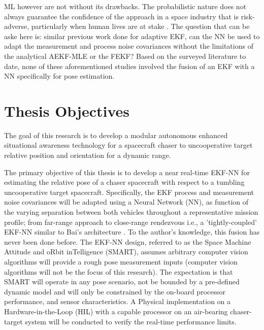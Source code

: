 ML however are not without its drawbacks. The probabilistic nature does not always guarantee the confidence of the approach in a space industry that is risk-adverse, particularly when human lives are at stake \cite{mcGovernMLSpaceLimits11, xuMLSpaceRelaibility2021107530}. The question that can be aske here is: similar previous work done for adaptive EKF, can the NN be used to adapt the measurement and process noise covariances without the limitations of the analytical AEKF-MLE or the FEKF? Based on the surveyed literature to date, none of these aforementioned studies involved the fusion of an EKF with a NN specifically for pose estimation. 
 
\section{Thesis Objectives}\label{CHAP1_4}

The goal of this research is to develop a modular autonomous enhanced situational awareness technology for a spacecraft chaser to uncooperative target relative position and orientation for a dynamic range.

The primary objective of this thesis is to develop a near real-time EKF-NN for estimating the relative pose of a chaser spacecraft with respect to a tumbling uncooperative target spacecraft. Specifically, the EKF process and measurement noise covariances will be adapted using a Neural Network (NN), as function of the varying separation between both vehicles throughout a representative mission profile; from far-range approach to close-range rendezvous i.e., a 'tightly-coupled' EKF-NN similar to Bai's architecture \cite{baiKf20}. To the author's knowledge, this fusion has never been done before. The EKF-NN design, referred to as the Space Machine Attitude and oRbit inTelligence (SMART), assumes arbitrary computer vision algorithms will provide a rough pose measurement inputs (computer vision algorithms will not be the focus of this research). The expectation is that SMART will operate in any pose scenario, not be bounded by a pre-defined dynamic model and will only be constrained by the on-board processor performance, and sensor characteristics.  A Physical implementation on a Hardware-in-the-Loop (HIL) with a capable processor on an air-bearing chaser-target system will be conducted to verify the real-time performance limits. 

